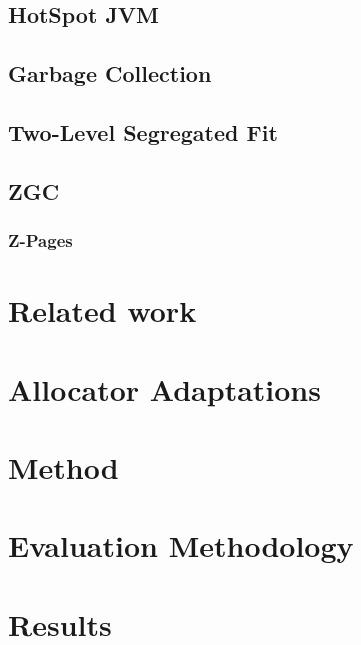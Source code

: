 \documentclass[a4paper,12pt]{article}
\begin{document}
\subsection{HotSpot JVM}
\label{sec:hotspot}


\subsection{Garbage Collection}
\label{sec:gc}


\subsection{Two-Level Segregated Fit}
\label{sec:tlsf}


\newpage
\subsection{ZGC}
\label{sec:zgc}


\subsubsection{Z-Pages}
\label{sec:zpage}


\section{Related work}


\section{Allocator Adaptations}
\label{sec:adaptations}


\section{Method}
\label{sec:method}


\section{Evaluation Methodology}
\label{sec:evaluation}


\section{Results}
\label{sec:results}

\end{document}
